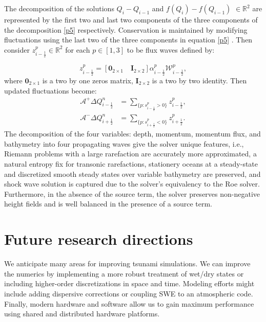 \documentclass[9pt,a4paper]{article}
\newcommand{\donna}[1]{{\color{red}{#1}}}
\begin{document}
	The decomposition of the solutions $Q_{i} - Q_{i-1} $  and  $f(Q_{i}) - f(Q_{i-1})$ $ \in  \mathbb{R}^{2}$ are represented by the first two and last two components of the three components of the decomposition \eqref{p5} respectively.  Conservation is maintained by modifying fluctuations using the last two of the three components  in equation \eqref{p5} . Then  consider $z_{i-\frac{1}{2}}^{p} \in \mathbb{R}^{2}$ for each $p \in [1,3]$ to be flux waves defined by:
	
	
	\begin{equation}
		z_{i-\frac{1}{2}}^{p} = [\mathbf{0}_{2\times1} \quad \mathbf{I}_{2\times2}] \alpha_{i-\frac{1}{2}}^{p} \mathcal{W}_{i-\frac{1}{2}}^{p},
	\end{equation}
	where $\mathbf{0}_{2\times1}$ is a two by one zeros matrix, $\mathbf{I}_{2\times2}$ is a two by two identity. Then updated fluctuations become:
	\begin{equation}
		\begin{aligned}
			\mathcal{A^{+}}\Delta Q_{i-\frac{1}{2}}^{n} & = \sum_{\{ p:s_{i-\frac{1}{2}}^{p}>0\}}  z_{i-\frac{1}{2}}^{p},\\
			\mathcal{A^{-}}\Delta Q_{i+\frac{1}{2}}^{n} &= \sum_{\{ p:s_{i+\frac{1}{2}}^{p}<0\}} z_{i+\frac{1}{2}}^{p}.
			\label{p8}
		\end{aligned}
	\end{equation}
	The decomposition of the four variables: depth, momentum, momentum flux, and bathymetry into four propagating waves give the solver unique features, i.e.,  Riemann problems with a large rarefaction are accurately more approximated, a natural entropy fix for transonic rarefactions,  stationery oceans at a steady-state and discretized smooth steady states over variable bathymetry are preserved, and shock wave solution is captured due to the solver's equivalency to the Roe solver.
	Furthermore, in the absence of the source term, the solver preserves non-negative height fields and is well balanced in the presence of a source term.  
	
	
	\section{ Future research directions}
	
	We anticipate many areas for improving tsunami simulations.  We can improve the numerics by implementing a more robust treatment of  wet/dry states or including higher-order discretizations in space and time. Modeling efforts might include adding dispersive corrections or coupling  SWE to an atmospheric code.   Finally, modern hardware and software allow us to gain maximum performance using shared and distributed hardware  platforms. 
	
\end{document}
